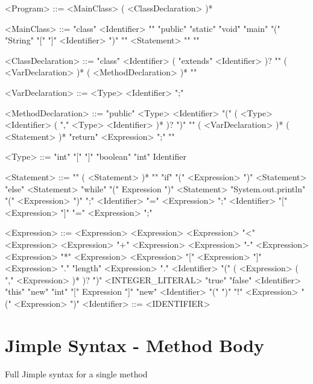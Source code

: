 \documentclass{report}
\begin{document}
\begin{grammar}
<Program>	::=	<MainClass> ( <ClassDeclaration> )*

<MainClass>	::=	"class" <Identifier> "{" "public" "static" "void" "main" "(" "String" "[" "]" <Identifier> ")" "{" <Statement> "}" "}"

<ClassDeclaration>	::=	"class" <Identifier> ( "extends" <Identifier> )? "{" ( <VarDeclaration> )* ( <MethodDeclaration> )* "}"

<VarDeclaration>	::=	<Type> <Identifier> ";"

<MethodDeclaration>	::=	"public" <Type> <Identifier> "(" ( <Type> <Identifier> ( "," <Type> <Identifier> )* )? ")" "{" ( <VarDeclaration> )* ( <Statement> )* "return" <Expression> ";" "}"

<Type>	::=	"int" "[" "]"
\alt	"boolean"
\alt	"int"
\alt	Identifier

<Statement>	::=	"{" ( <Statement> )* "}"
\alt	"if" "(" <Expression> ")" <Statement> "else" <Statement>
\alt	"while" "(" Expression ")" <Statement>
\alt	"System.out.println" "(" <Expression> ")" ";"
\alt	<Identifier> "=" <Expression> ";"
\alt	<Identifier> "[" <Expression> "]" "=" <Expression> ";"

<Expression>	::=	<Expression> <Expression>
\alt <Expression> "<" <Expression>
\alt <Expression> "+" <Expression>
\alt <Expression>  "-" <Expression>
\alt <Expression> "*" <Expression>
\alt	<Expression> "[" <Expression> "]"
\alt	<Expression> "." "length"
\alt	<Expression> "." <Identifier> "(" ( <Expression> ( "," <Expression> )* )? ")"
\alt	<INTEGER_LITERAL>
\alt	"true"
\alt	"false"
\alt	<Identifier>
\alt	"this"
\alt	"new" "int" "[" Expression "]"
\alt	"new" <Identifier> "(" ")"
\alt	"!" <Expression>
\alt	"(" <Expression> ")"
<Identifier>	::=	<IDENTIFIER>
\end{grammar}

\section{Jimple Syntax - Method Body}
\label{sec:jimple}
Full Jimple syntax for a single method ~\cite{Vallee-Rai98jimple:simplifying}
\end{document}
